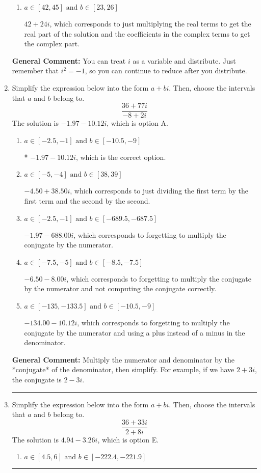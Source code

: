 \documentclass{extbook}[14pt]
\newcommand{\litem}[1]{\item #1

\rule{\textwidth}{0.4pt}}
\begin{document}
\begin{enumerate}
{\begin{enumerate}[label=\Alph*.]
* $18 - 74 i$, which is the correct option.
\item \( a \in [42, 45] \text{ and } b \in [23, 26] \)

 $42 + 24 i$, which corresponds to just multiplying the real terms to get the real part of the solution and the coefficients in the complex terms to get the complex part.
\end{enumerate}

\textbf{General Comment:} You can treat $i$ as a variable and distribute. Just remember that $i^2=-1$, so you can continue to reduce after you distribute.
}
\litem{
Simplify the expression below into the form $a+bi$. Then, choose the intervals that $a$ and $b$ belong to.
\[ \frac{36 + 77 i}{-8 + 2 i} \]The solution is \( -1.97  - 10.12 i \), which is option A.\begin{enumerate}[label=\Alph*.]
\item \( a \in [-2.5, -1] \text{ and } b \in [-10.5, -9] \)

* $-1.97  - 10.12 i$, which is the correct option.
\item \( a \in [-5, -4] \text{ and } b \in [38, 39] \)

 $-4.50  + 38.50 i$, which corresponds to just dividing the first term by the first term and the second by the second.
\item \( a \in [-2.5, -1] \text{ and } b \in [-689.5, -687.5] \)

 $-1.97  - 688.00 i$, which corresponds to forgetting to multiply the conjugate by the numerator.
\item \( a \in [-7.5, -5] \text{ and } b \in [-8.5, -7.5] \)

 $-6.50  - 8.00 i$, which corresponds to forgetting to multiply the conjugate by the numerator and not computing the conjugate correctly.
\item \( a \in [-135, -133.5] \text{ and } b \in [-10.5, -9] \)

 $-134.00  - 10.12 i$, which corresponds to forgetting to multiply the conjugate by the numerator and using a plus instead of a minus in the denominator.
\end{enumerate}

\textbf{General Comment:} Multiply the numerator and denominator by the *conjugate* of the denominator, then simplify. For example, if we have $2+3i$, the conjugate is $2-3i$.
}
\litem{
Simplify the expression below into the form $a+bi$. Then, choose the intervals that $a$ and $b$ belong to.
\[ \frac{36 + 33 i}{2 + 8 i} \]The solution is \( 4.94  - 3.26 i \), which is option E.\begin{enumerate}[label=\Alph*.]
\item \( a \in [4.5, 6] \text{ and } b \in [-222.4, -221.9] \)


\end{enumerate}}
\end{enumerate}
\end{document}
